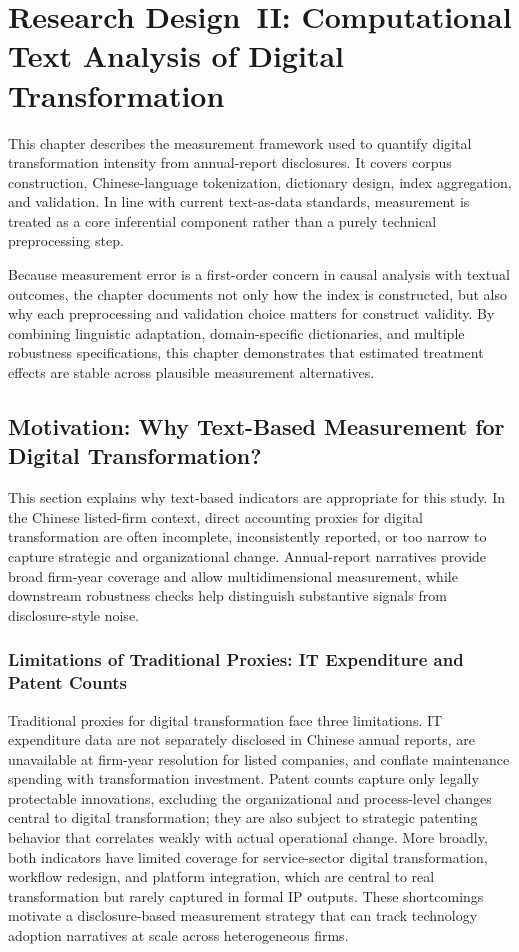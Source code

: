 \chapter{Research Design~II: Computational Text Analysis of Digital Transformation}
\label{chap:research_design_2}

This chapter describes the measurement framework used to quantify digital transformation intensity from annual-report disclosures. It covers corpus construction, Chinese-language tokenization, dictionary design, index aggregation, and validation. In line with current text-as-data standards, measurement is treated as a core inferential component rather than a purely technical preprocessing step.

Because measurement error is a first-order concern in causal analysis with textual outcomes, the chapter documents not only how the index is constructed, but also why each preprocessing and validation choice matters for construct validity. By combining linguistic adaptation, domain-specific dictionaries, and multiple robustness specifications, this chapter demonstrates that estimated treatment effects are stable across plausible measurement alternatives.

\section{Motivation: Why Text-Based Measurement for Digital Transformation?}

This section explains why text-based indicators are appropriate for this study. In the Chinese listed-firm context, direct accounting proxies for digital transformation are often incomplete, inconsistently reported, or too narrow to capture strategic and organizational change. Annual-report narratives provide broad firm-year coverage and allow multidimensional measurement, while downstream robustness checks help distinguish substantive signals from disclosure-style noise.

\subsection{Limitations of Traditional Proxies: IT Expenditure and Patent Counts}

Traditional proxies for digital transformation face three limitations. IT expenditure data are not separately disclosed in Chinese annual reports, are unavailable at firm-year resolution for listed companies, and conflate maintenance spending with transformation investment. Patent counts capture only legally protectable innovations, excluding the organizational and process-level changes central to digital transformation; they are also subject to strategic patenting behavior that correlates weakly with actual operational change. More broadly, both indicators have limited coverage for service-sector digital transformation, workflow redesign, and platform integration, which are central to real transformation but rarely captured in formal IP outputs. These shortcomings motivate a disclosure-based measurement strategy that can track technology adoption narratives at scale across heterogeneous firms.

